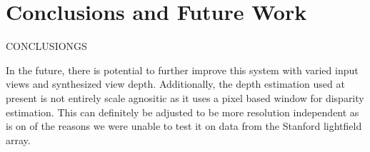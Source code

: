 \documentclass[10pt,twocolumn,letterpaper]{article}
\begin{document}
\section{Conclusions and Future Work}

CONCLUSIONGS

In the future, there is potential to further improve this system with varied input views and synthesized
view depth. Additionally, the depth estimation used at present is not entirely scale agnositic as it
uses a pixel based window for disparity estimation. This can definitely be adjusted to be more resolution
independent as is on of the reasons we were unable to test it on data from the Stanford lightfield array.

{\small


}
\end{document}
